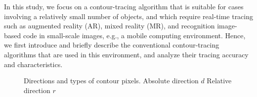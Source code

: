 In this study, we focus on a contour-tracing algorithm that is suitable for cases involving a relatively small number of objects, and which require real-time tracing such as augmented reality (AR), mixed reality (MR), and recognition image-based code in small-scale images, e.g., a mobile computing environment. Hence, we first introduce and briefly describe the conventional contour-tracing algorithms that are used in this environment, and analyze their tracing accuracy and characteristics. 

\begin{figure}[htbp]
	\centering
	 
	\caption{Directions and types of contour pixels. \protect{} Absolute direction $d$ \protect{} Relative direction $r$ \protect{} }
	\label{fig:image2}
\end{figure}


